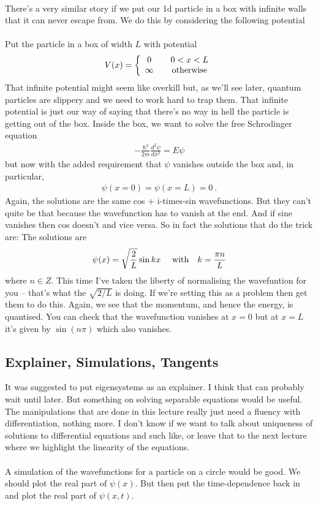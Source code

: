 \documentclass[12pt]{article}
\def\be{\begin{eqnarray}}
\def\ee{\end{eqnarray}}
\newcommand{\nn}{\nonumber}
\newcommand\para{\paragraph{}}
\begin{document}
\para
There's a very similar story if we put our 1d particle in a box with infinite walls that it can never escape from. We do this by considering the following potential
%
\para
{\color{olive} Put the particle in a box of width $L$ with potential
%
\be V(x) = \left\{\begin{array}{cc} 0 \ \ \ & 0<x<L\\ \infty \ \ \ &{\rm otherwise}\end{array}\right.\nn\ee
%
}That infinite potential  might seem like overkill but, as we'll see later, quantum particles are slippery and we need to work hard to trap them. That infinite potential is just our way of saying that there's no way in hell the particle is getting out of the box. {\color{olive} Inside the box, we want to solve the free Schrodinger equation
%
\be -\frac{\hbar^2}{2m} \frac{d^2\psi}{dx^2} = E\psi\nn\ee
%
but now with the added requirement that $\psi$ vanishes outside the box and, in particular, 
%
\be \psi(x=0) = \psi(x=L)  = 0 \ .\ee
%
}Again, the solutions are the same cos + i-times-sin wavefunctions. But they can't quite be that because the wavefunction has to vanish at the end. And if sine vanishes then cos doesn't and vice versa. So in fact the solutions that do the trick are: {\color{olive} The solutions are
%
\be \psi(x) = \sqrt{\frac{2}{L}}\sin kx\  \ \ \ {\rm with} \ \ \ k=\frac{\pi n}{L} \nn\ee
%
where $n\in Z$.} This time I've taken the liberty of normalising the wavefuntion for you -- that's what the $\sqrt{2/L}$ is doing. {\color{blue} If we're setting this as a problem then get them to do this.} Again, we see that the momentum, and hence the energy, is quantised. You can check that the wavefunction vanishes at $x=0$ but at $x=L$ it's given by $\sin(n\pi)$ which also vanishes. 


\subsection{Explainer, Simulations, Tangents}

It was suggested to put eigensystems as an explainer. I think that can probably wait until later. But something on solving separable equations would be useful. The manipulations that are done  in this lecture really just need a fluency with differentiation, nothing more. I don't know if we want to talk about uniqueness of solutions to differential equations and such like, or leave that to the next lecture where we highlight the linearity of the equations.

\para
A simulation of the wavefunctions for a particle on a circle would be good. We should plot the real part of $\psi(x)$. But then put the time-dependence back in and plot the real part of $\psi(x,t)$. 
\end{document}
